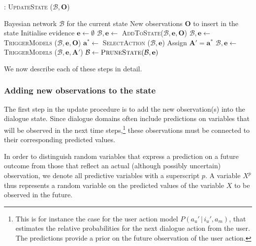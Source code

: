 \begin{algorithm}[ht]
\caption{: \textsc{UpdateState} ($\mathcal{B}, \mathbf{O}$)}
\begin{algorithmic}[1] \vspace{1mm}
\REQUIRE Bayesian network $\mathcal{B}$ for the current state
\REQUIRE New observations $\mathbf{O}$ to insert in the state \vspace{1mm}
\STATE Initialise evidence $\mathbf{e} \leftarrow \emptyset$
\STATE $\mathcal{B}, \mathbf{e} \leftarrow $ \textsc{AddToState}($\mathcal{B}, \mathbf{e}, \mathbf{O}$)
\STATE $\mathcal{B}, \mathbf{e} \leftarrow$ \textsc{TriggerModels} ($\mathcal{B}, \mathbf{e},  \mathbf{O}$) \vspace{1mm}
\STATE $\mathbf{a}^* \leftarrow $ \textsc{SelectAction} ($\mathcal{B}, \mathbf{e}$)
\STATE Assign $\mathbf{A}' = \mathbf{a}^*$
\STATE $\mathcal{B}, \mathbf{e} \leftarrow$ \textsc{TriggerModels} ($\mathcal{B}, \mathbf{e}, \mathbf{A}'$)
\ENDWHILE \vspace{1mm}
\STATE $\mathcal{B} \leftarrow \textsc{PruneState} (\mathcal{B}, \mathbf{e})$ \vspace{1mm}
\end{algorithmic}
\label{algo:stateupdate}
\end{algorithm}

We now describe each of these steps in detail.

\subsubsection*{Adding new observations to the state}

The first step in the update procedure is to add the new observation(s) into the dialogue state. Since dialogue domains often include predictions on variables that will be observed in the next time steps,\footnote{This is for instance the case for the user action model $P(a_u' \, | \, i_u', a_m)$, that estimates the relative probabilities for the next dialogue action from the user. The predictions provide a prior on the future observation of the user action.} these observations must be connected to their corresponding predicted values.

In order to distinguish random variables that express a prediction on a future outcome from those that reflect an actual (although possibly uncertain) observation, we denote all predictive variables with a superscript $p$. A variable $X^p$ thus represents a random variable on the predicted values of the variable $X$ to be observed in the future. 


